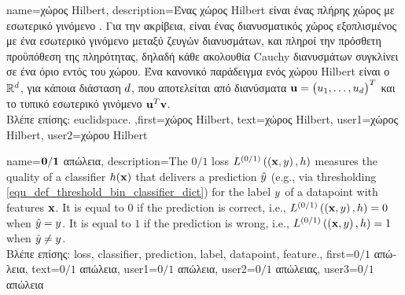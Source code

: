 {name={\foreignlanguage{greek}{χώρος} Hilbert},
	description={\foreignlanguage{greek}{Ένας χώρος} Hilbert \foreignlanguage{greek}{είναι ένας 
		πλήρης χώρος με εσωτερικό γινόμενο} \cite{introhilbertbook}. \foreignlanguage{greek}{Για την ακρίβεια, είναι ένας διανυσματικός χώρος 
		εξοπλισμένος με ένα εσωτερικό γινόμενο μεταξύ ζευγών διανυσμάτων, και πληροί την πρόσθετη προϋπόθεση της πληρότητας, 
		δηλαδή κάθε ακολουθία} Cauchy \foreignlanguage{greek}{διανυσμάτων συγκλίνει σε ένα όριο εντός του χώρου.  
		Ένα κανονικό παράδειγμα ενός χώρου} Hilbert \foreignlanguage{greek}{είναι ο}  $\mathbb{R}^{d}$, 
		\foreignlanguage{greek}{για κάποια διάσταση $d$, που αποτελείται από διανύσματα ${\bf u} = \big(u_1, \ldots, u_{d}\big)^T$ 
		και το τυπικό εσωτερικό γινόμενο} ${\bf u}^T {\bf v}$.\\
		\foreignlanguage{greek}{Βλέπε επίσης:} \gls{euclidspace}.
		},first={\foreignlanguage{greek}{χώρος} Hilbert},
		text={\foreignlanguage{greek}{χώρος} Hilbert},
		user1={\foreignlanguage{greek}{χώρος} Hilbert}, %
		user2={\foreignlanguage{greek}{χώρου} Hilbert} %
}

{name={$\bf 0/1$ \foreignlanguage{greek}{απώλεια}},
	description={The $0/1$ \gls{loss} $L^{(0/1)}\left(\left( {\bf x},y \right),h \right)$ 
		measures the quality of a \gls{classifier} $h({\bf x})$ that delivers a 
		\gls{prediction} $\hat{y}$ (e.g., via thresholding \eqref{equ_def_threshold_bin_classifier_dict}) 
		for the \gls{label} $y$ of a \gls{datapoint} with \gls{feature}s ${\bf x}$. It is equal to $0$ if 
		the \gls{prediction} is correct, i.e., 
	$L^{(0/1)}\left(\left( {\bf x},y \right),h \right)=0$ when $\hat{y}=y$. It is 
	equal to $1$ if the \gls{prediction} is wrong, i.e., $L^{(0/1)}\left(\left( {\bf x},y \right),h \right)=1$ 
	when $\hat{y}\neq y$.\\
	\foreignlanguage{greek}{Βλέπε επίσης:} \gls{loss}, \gls{classifier}, \gls{prediction}, \gls{label}, \gls{datapoint}, \gls{feature}.},
    first={\foreignlanguage{greek}{$0/1$ απώλεια}},
    text={\foreignlanguage{greek}{$0/1$ απώλεια}},
    user1={\foreignlanguage{greek}{$0/1$ απώλεια}}, %
    user2={\foreignlanguage{greek}{$0/1$ απώλειας}}, %
    user3={\foreignlanguage{greek}{$0/1$ απώλεια}} %
}








